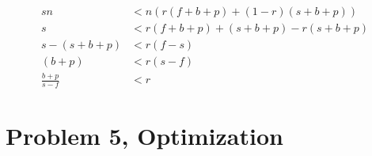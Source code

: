 \documentclass[fontsize=11pt, paper=a4, titlepage]{article}
\begin{document}
\begin{enumerate}[a)]
\begin{enumerate}[I)]
        \begin{align*}
            sn &< n(r(f+b+p) + (1-r)(s+b+p)) \\
            s &< r(f+b+p) + (s+b+p) -r(s+b+p) \\
            s - (s+b+p) &< r(f-s) \\
            (b+p) &< r(s-f) \\
            \frac{b+p}{s-f} &< r
        \end{align*}

    \end{enumerate}
\end{enumerate}

\section{Problem 5, Optimization}
\end{document}
